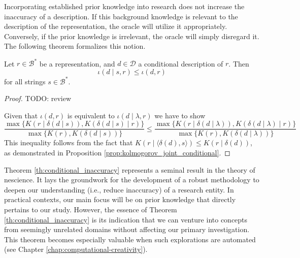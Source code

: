 Incorporating established prior knowledge into research does not increase the inaccuracy of a description. If this background knowledge is relevant to the description of the representation, the oracle will utilize it appropriately. Conversely, if the prior knowledge is irrelevant, the oracle will simply disregard it. The following theorem formalizes this notion.

\begin{theorem}
\label{th:conditional_inaccuracy}
Let $r \in \mathcal{B}^\ast$ be a representation, and $d \in \mathcal{D}$ a conditional description of $r$. Then
\[
\iota(d \mid s, r) \leq \iota(d , r)
\]
for all strings $s \in \mathcal{B}^\ast$.
\end{theorem}
\begin{proof}
{\color{red} TODO: review

Given that $\iota(d , r)$ is equivalent to $\iota(d \mid \lambda, r)$ we have to show 
\[
\frac{ \max\{ K \left(r \mid \delta(d \mid s) \right), K \left( \delta(d \mid s) \mid r \right) \} } { \max\{ K(r), K \left( \delta(d \mid s) \right) \} } \leq \frac{ \max\{ K \left(r \mid \delta(d \mid \lambda ) \right), K \left( \delta(d \mid \lambda ) \mid r \right) \} } { \max\{ K(r), K \left( \delta(d \mid \lambda ) \right) \} }
\]
This inequality follows from the fact that $K \left(r \mid \langle \delta(d), s \rangle \right) \leq  K \left(r \mid \delta(d) \right)$, as demonstrated in Proposition \ref{prop:kolmogorov_joint_conditional}.
}
\end{proof}

Theorem \ref{th:conditional_inaccuracy} represents a seminal result in the theory of nescience. It lays the groundwork for the development of a robust methodology to deepen our understanding (i.e., reduce inaccuracy) of a research entity. In practical contexts, our main focus will be on prior knowledge that directly pertains to our study. However, the essence of Theorem \ref{th:conditional_inaccuracy} is its indication that we can venture into concepts from seemingly unrelated domains without affecting our primary investigation. This theorem becomes especially valuable when such explorations are automated (see Chapter \ref{chap:computational-creativity}).

